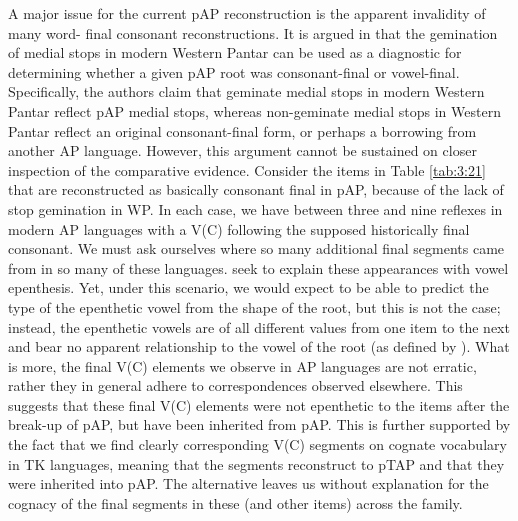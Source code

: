 A major issue for the current pAP reconstruction is the apparent invalidity of many word- final consonant reconstructions. It is argued in \citet[95]{HoltonEtAl2012} that the gemination of medial stops in modern Western Pantar can be used as a diagnostic for determining whether a given pAP root was consonant-final or vowel-final. Specifically, the authors claim that geminate medial stops in modern Western Pantar reflect pAP medial stops, whereas non-geminate medial stops in Western Pantar reflect an original consonant-final form, or perhaps a borrowing from another AP language. However, this argument cannot be sustained on closer inspection of the comparative evidence. Consider the items in Table \ref{tab:3:21} that are reconstructed as basically consonant final in pAP, because of the lack of stop gemination in WP. In each case, we have between three and nine reflexes in modern AP languages with a V(C) following the supposed historically final consonant. We must ask ourselves where so many additional final segments came from in so many of these languages. \citet{HoltonEtAl2012} seek to explain these appearances with vowel epenthesis. Yet, under this scenario, we would expect to be able to predict the type of the epenthetic vowel from the shape of the root, but this is not the case; instead, the epenthetic vowels are of all different values from one item to the next and bear no apparent relationship to the vowel of the root (as defined by \citealt{HoltonEtAl2012}). What is more, the final V(C) elements we observe in AP languages are not erratic, rather they in general adhere to correspondences observed elsewhere. This suggests that these final V(C) elements were not epenthetic to the items after the break-up of pAP, but have been inherited from pAP. This is further supported by the fact that we find clearly corresponding V(C) segments on cognate vocabulary in TK languages, meaning that the segments reconstruct to pTAP and that they were inherited into pAP. The alternative leaves us without explanation for the cognacy of the final segments in these (and other items) across the family. 
 


